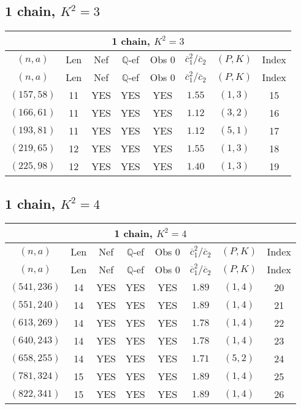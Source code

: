 \subsection{1 chain, $K^2 = 3$}
\begin{longtable}{|c|c|c|c|c|c|c|c|}
\hline
\multicolumn{8}{|c|}{1 chain, $K^2 = 3$}\\
\hline
$(n,a)$ & Len & Nef & $\mathbb Q$-ef & Obs 0 & $\overline c_1^2 / \overline c_2$ & $(P,K)$ & Index\\
\hline
\endfirsthead

\hline
$(n,a)$ & Len & Nef & $\mathbb Q$-ef & Obs 0 & $\overline c_1^2 / \overline c_2$ & $(P,K)$ & Index\\
\hline
\endhead
\hline
\endfoot

$(157,58)$ & 11 & YES & YES & YES & $1.55$ & $(1,3)$ & 15\\
$(166,61)$ & 11 & YES & YES & YES & $1.12$ & $(3,2)$ & 16\\
$(193,81)$ & 11 & YES & YES & YES & $1.12$ & $(5,1)$ & 17\\
$(219,65)$ & 12 & YES & YES & YES & $1.55$ & $(1,3)$ & 18\\
$(225,98)$ & 12 & YES & YES & YES & $1.40$ & $(1,3)$ & 19
\end{longtable}
\subsection{1 chain, $K^2 = 4$}
\begin{longtable}{|c|c|c|c|c|c|c|c|}
\hline
\multicolumn{8}{|c|}{1 chain, $K^2 = 4$}\\
\hline
$(n,a)$ & Len & Nef & $\mathbb Q$-ef & Obs 0 & $\overline c_1^2 / \overline c_2$ & $(P,K)$ & Index\\
\hline
\endfirsthead

\hline
$(n,a)$ & Len & Nef & $\mathbb Q$-ef & Obs 0 & $\overline c_1^2 / \overline c_2$ & $(P,K)$ & Index\\
\hline
\endhead
\hline
\endfoot

$(541,236)$ & 14 & YES & YES & YES & $1.89$ & $(1,4)$ & 20\\
$(551,240)$ & 14 & YES & YES & YES & $1.89$ & $(1,4)$ & 21\\
$(613,269)$ & 14 & YES & YES & YES & $1.78$ & $(1,4)$ & 22\\
$(640,243)$ & 14 & YES & YES & YES & $1.78$ & $(1,4)$ & 23\\
$(658,255)$ & 14 & YES & YES & YES & $1.71$ & $(5,2)$ & 24\\
$(781,324)$ & 15 & YES & YES & YES & $1.89$ & $(1,4)$ & 25\\
$(822,341)$ & 15 & YES & YES & YES & $1.89$ & $(1,4)$ & 26
\end{longtable}
